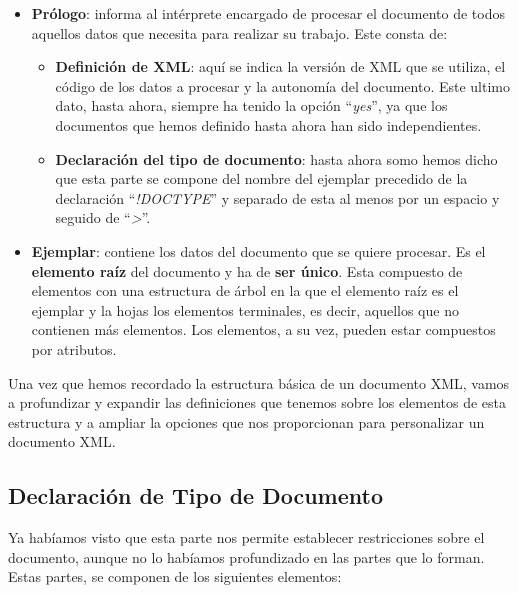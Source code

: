 \begin{itemize}
    \item \textbf{Prólogo}: informa al intérprete encargado de procesar el documento de todos aquellos datos que necesita para realizar su trabajo. Este consta de:
    \begin{itemize}
        \item \textbf{Definición de XML}: aquí se indica la versión de XML que se utiliza, el código de los datos a procesar y la autonomía del documento. Este ultimo dato, hasta ahora, siempre ha tenido la opción ``\textit{yes}'', ya que los documentos que hemos definido hasta ahora han sido independientes.

        \item \textbf{Declaración del tipo de documento}: hasta ahora somo hemos dicho que esta parte se compone del nombre del ejemplar precedido de la declaración ``\textit{!DOCTYPE}'' y separado de esta al menos por un espacio y seguido de  ``\textit{>}''.
    \end{itemize}

    \item \textbf{Ejemplar}: contiene los datos del documento que se quiere procesar. Es el \textbf{elemento raíz} del documento y ha de \textbf{ser único}. Esta compuesto de elementos con una estructura de árbol en la que el elemento raíz es el ejemplar y la hojas los elementos terminales, es decir, aquellos que no contienen más elementos. Los elementos, a su vez, pueden estar compuestos por atributos.
\end{itemize}

Una vez que hemos recordado la estructura básica de un documento XML, vamos a profundizar y expandir las definiciones que tenemos sobre los elementos de esta estructura y a ampliar la opciones que nos proporcionan para personalizar un documento XML.

\subsection{Declaración de Tipo de Documento}
Ya habíamos visto que esta parte nos permite establecer restricciones sobre el documento, aunque no lo habíamos profundizado en las partes que lo forman. Estas partes, se componen de los siguientes elementos:

